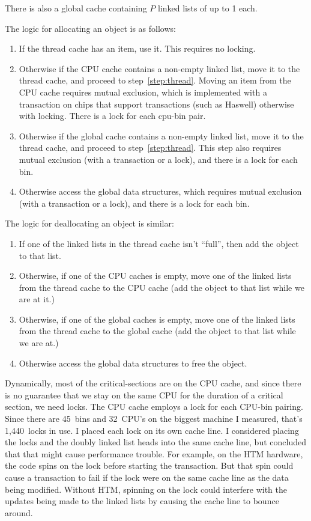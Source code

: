 \documentclass[natbib,sort&compress,10pt]{sigplanconf}
\begin{document}
There is also a global cache containing $P$ linked lists of up to
\unit{1}\mebi\byte{} each. 

The logic for allocating an object is as follows:
\begin{enumerate}
\item If the thread cache has an item, use it.  This requires no
  locking. \label{step:thread}
\item Otherwise if the CPU cache contains a non-empty linked list,
  move it to the thread cache, and proceed to step~\ref{step:thread}.
  Moving an item from the CPU cache requires mutual exclusion, which
  is implemented with a transaction on chips that support transactions
  (such as Haswell) otherwise with locking. There is a lock for each
  cpu-bin pair.\label{step:cpu}
\item Otherwise if the global cache contains a non-empty linked list,
  move it to the thread cache, and proceed to step~\ref{step:thread}.
  This step also requires mutual exclusion (with a transaction or a
  lock), and there is a lock for each bin.
\item Otherwise access the global data structures, which requires
  mutual exclusion (with a transaction or a lock), and there is a lock
  for each bin.
\end{enumerate}

The logic for deallocating an object is similar:
\begin{enumerate}
\item If one of the linked lists in the thread cache isn't ``full'',
  then add the object to that list.
\item Otherwise, if one of the CPU caches is empty, move one of the
  linked lists from the thread cache to the CPU cache (add the object
  to that list while we are at it.)
\item Otherwise, if one of the global caches is empty, move one of the
  linked lists from the thread cache to the global cache (add the
  object to that list while we are at.)
\item Otherwise access the global data structures to free the object.
\end{enumerate}

Dynamically, most of the critical-sections are on the CPU cache, and
since there is no guarantee that we stay on the same CPU for the
duration of a critical section, we need locks.  The CPU cache employs
a lock for each CPU-bin pairing.  Since there are 45~bins and 32~CPU's
on the biggest machine I measured, that's 1,440~locks in use.  I
placed each lock on its own cache line.  I considered placing the
locks and the doubly linked list heads into the same cache line, but
concluded that that might cause performance trouble.  For example, on
the HTM hardware, the code spins on the lock before starting the
transaction.  But that spin could cause a transaction to fail if the
lock were on the same cache line as the data being modified.  Without
HTM, spinning on the lock could interfere with the updates being made
to the linked lists by causing the cache line to bounce around.
\end{document}
